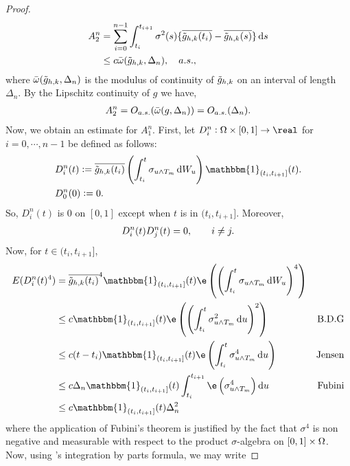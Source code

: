 \begin{proof}
\begin{align}
  A_{2}^n &= \sumin \int_{t_i}^{t_{i+1}} \sigma^2(s)  \{\btghki - \btghks\} \D s\notag\\
  &\le c\modc{\tghk}{\Delta_n},\quad a.s.,\notag
  \label{}
\end{align}
where ${\bar{\omega}}({\tilde{g}_{h,k}},\Delta_n)$ is the modulus of continuity of $\tilde{g}_{h,k}$ on an interval of length $\Delta_n$.  By the Lipschitz continuity of $g$ we have, 
\begin{align}
  A_{2}^n = O_{a.s.}({\bar{\omega}}({g},\Delta_n)) = O_{a.s.}( \Delta_n). \notag 
  \label{}
\end{align}
Now, we obtain an estimate for $A_{1}^n$.
First, let $D_i^n: \Omega\times[0,1] \to \real$ for $i = 0, \cdots, n-1$ be defined as follows:  
\begin{align}
&D_{i}^n(t) := \btghki\left(\int_{t_i}^{t} \sigma_{u \wedge T_m}\D W_u\right)\mathbbm{1}_{(t_i, t_{i+1}]}(t).
  \label{eq:Di}\\
&D_0^n(0) := 0.
\end{align}
So, $D_i^n(t)$ is 0 on $[0,1]$ except when $t$ is in $(t_i, t_{i+1}]$. Moreover,  
\begin{align}
  D_i^n (t) D_j^n(t) = 0, \qquad i \not = j.\notag
  \label{}
\end{align}
Now, for $t \in (t_i, t_{i+1}]$,
\begin{align}
E(D_i^n(t)^4) &= \btghki^4\mathbbm{1}_{(t_i, t_{i+1}]}(t)\e\left( \left(\int_{t_i}^{t} \sigma_{u\wedge T_m}\D W_u\right)^4\right)& \notag\\
& \le c\mathbbm{1}_{(t_i, t_{i+1}]}(t)\e\left( \left(\int_{t_i}^{t} \sigma_{u\wedge T_m}^2\D u\right)^2\right) &\text{B.D.G}\notag\\
& \le c(t - t_i)\mathbbm{1}_{(t_i, t_{i+1}]}(t) \e \left(\int_{t_i}^{t} \sigma_{u\wedge T_m}^4\D u\right)&\text{Jensen}\notag\\
  & \le c\Delta_n\mathbbm{1}_{(t_i, t_{i+1}]}(t)\int_{t_i}^{t_{i+1}} \e\left(\sigma_{u\wedge T_m}^4\right) \D u &\text{Fubini}\notag \\
  & \le c \mathbbm{1}_{(t_i, t_{i+1}]}(t)\Delta_n^2 &
  \label{eq:dz}
\end{align}
where the application of Fubini's theorem \citep[Theorem VII.36.B]{Halmos1950} is justified by the fact that $\sigma^4$ is non negative and measurable with respect to the product $\sigma$-algebra on $[0,1]\times\Omega$.
Now, using \ito's integration by parts formula, we may write

\end{proof}
